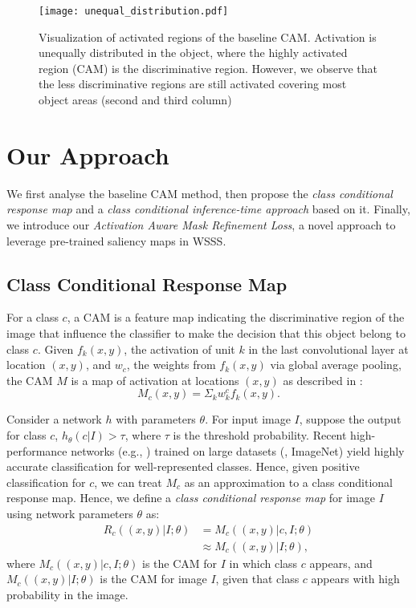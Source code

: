\documentclass[10pt,twocolumn,letterpaper]{article}
\begin{document}
\begin{figure}[t!]
   \begin{center}
   {\texttt{[image: unequal\_distribution.pdf]}}
   \end{center}
\vspace{-2mm}
\caption{Visualization of activated regions of the baseline CAM. 
Activation is unequally distributed in the object, where the highly activated region (CAM) is the discriminative region.
However, we observe that the
less discriminative regions are still activated covering most object areas (second and third column)}
\vspace{-4mm}
   \label{fig: unequal distribution}
\end{figure}

\section{Our Approach}
We first analyse the baseline CAM method, then propose the \emph{class conditional response map} and a
\emph{class conditional inference-time approach} 
based on it. Finally, we introduce our \emph{Activation Aware Mask Refinement Loss}, a novel approach to leverage pre-trained saliency maps in WSSS.



\subsection{Class Conditional Response Map}
\label{sec: Class Conditional Response Map}
For a class $c$, a CAM \cite{zhou2016learning} is a feature map indicating the discriminative region of the image that influence the classifier to make the decision that this object belong to class $c$.
Given $f_k(x,y)$, the activation of unit $k$ in the last convolutional layer at location $(x,y)$, and $w_c$, the weights from  $f_k(x,y)$ 
via global average pooling, the CAM $M$ is a map of activation at locations $(x,y)$ as described in \cite{zhou2016learning}:
\begin{equation}
M_c(x,y) = \Sigma_k w^c_k f_k(x,y).
\label{ClassicalCAM}
\end{equation}


Consider a network $h$ with parameters $\theta$.
For input image $I$, suppose the output for class $c$, $h_{\theta}(c|I) > \tau$, where $\tau$ is the threshold probability. Recent high-performance networks  (e.g., \cite{huang2017densely,He_2016_CVPR}) trained on large datasets (\eg, ImageNet) yield highly accurate classification for well-represented classes.
Hence, given positive classification for $c$, we can treat $M_c$ as an approximation to a class conditional response map.
Hence, we define a \emph{class conditional response map} for image $I$ using network parameters $\theta$ as:
\begin{eqnarray}
    R_c((x,y)|I; \theta)  &= M_c((x,y)|c,I;\theta) \\ &\approx M_c((x,y)|I;\theta), \nonumber
\end{eqnarray}
where $ M_c((x,y)|c,I;\theta)$ is the CAM for $I$ in which  class $c$ appears, and $ M_c((x,y)|I;\theta)$ is the CAM for image $I$, 
given
that class $c$ appears with high probability in the image.
\end{document}
